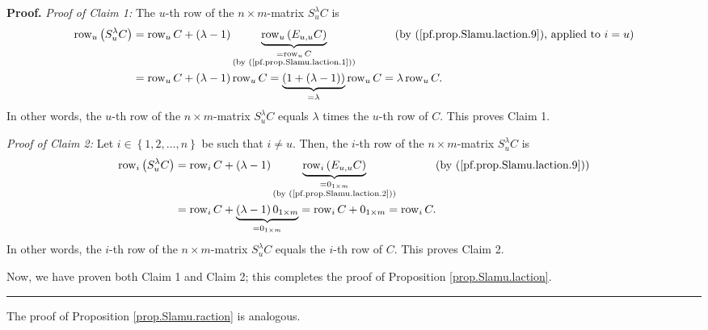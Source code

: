 \documentclass[numbers=enddot,12pt,final,onecolumn,notitlepage]{scrartcl}%
\theoremstyle{definition}
\newenvironment{proof}[1][Proof]{\noindent\textbf{#1.} }{\ \rule{0.5em}{0.5em}}
\begin{document}
\begin{proof}
\textit{Proof of Claim 1:} The $u$-th row of the $n\times m$-matrix
$S_{u}^{\lambda}C$ is%
\begin{align*}
\operatorname*{row}\nolimits_{u}\left(  S_{u}^{\lambda}C\right)   &
=\operatorname*{row}\nolimits_{u}C+\left(  \lambda-1\right)
\underbrace{\operatorname*{row}\nolimits_{u}\left(  E_{u,u}C\right)
}_{\substack{=\operatorname*{row}\nolimits_{u}C\\\text{(by
(\ref{pf.prop.Slamu.laction.1}))}}}\ \ \ \ \ \ \ \ \ \ \left(  \text{by
(\ref{pf.prop.Slamu.laction.9}), applied to }i=u\right) \\
&  =\operatorname*{row}\nolimits_{u}C+\left(  \lambda-1\right)
\operatorname*{row}\nolimits_{u}C=\underbrace{\left(  1+\left(  \lambda
-1\right)  \right)  }_{=\lambda}\operatorname*{row}\nolimits_{u}%
C=\lambda\operatorname*{row}\nolimits_{u}C.
\end{align*}
In other words, the $u$-th row of the $n\times m$-matrix $S_{u}^{\lambda}C$
equals $\lambda$ times the $u$-th row of $C$. This proves Claim 1.

\textit{Proof of Claim 2:} Let $i\in\left\{  1,2,\ldots,n\right\}  $ be such
that $i\neq u$. Then, the $i$-th row of the $n\times m$-matrix $S_{u}%
^{\lambda}C$ is%
\begin{align*}
\operatorname*{row}\nolimits_{i}\left(  S_{u}^{\lambda}C\right)   &
=\operatorname*{row}\nolimits_{i}C+\left(  \lambda-1\right)
\underbrace{\operatorname*{row}\nolimits_{i}\left(  E_{u,u}C\right)
}_{\substack{=0_{1\times m}\\\text{(by (\ref{pf.prop.Slamu.laction.2}))}%
}}\ \ \ \ \ \ \ \ \ \ \left(  \text{by (\ref{pf.prop.Slamu.laction.9})}\right)
\\
&  =\operatorname*{row}\nolimits_{i}C+\underbrace{\left(  \lambda-1\right)
0_{1\times m}}_{=0_{1\times m}}=\operatorname*{row}\nolimits_{i}C+0_{1\times
m}=\operatorname*{row}\nolimits_{i}C.
\end{align*}
In other words, the $i$-th row of the $n\times m$-matrix $S_{u}^{\lambda}C$
equals the $i$-th row of $C$. This proves Claim 2.

Now, we have proven both Claim 1 and Claim 2; this completes the proof of
Proposition \ref{prop.Slamu.laction}.
\end{proof}

The proof of Proposition \ref{prop.Slamu.raction} is analogous.
\end{document}
